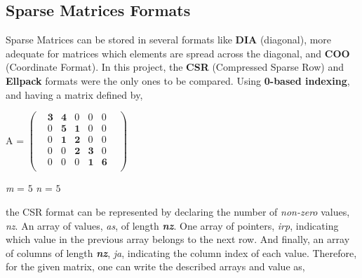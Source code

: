 \documentclass[12pt]{article}
\begin{document}
\subsection*{Sparse Matrices Formats}

\par Sparse Matrices can be stored in several formats like \textbf{DIA} (diagonal), more adequate for matrices which elements are spread across the diagonal,  and \textbf{COO} (Coordinate Format).\cite{sparse-gpu} In this project, the \textbf{CSR} (Compressed Sparse Row) and \textbf{Ellpack} formats were the only ones to be compared. Using \textbf{0-based indexing}, and having a matrix defined by,

\begin{center}
\centering
\begin{minipage}{.4\textwidth}
  \flushright
  A  =   
	$
	\begin{pmatrix}
    & \textbf{3} & \textbf{4} & 0 & 0 & 0 & \\
    & 0 & \textbf{5} & \textbf{1} & 0 & 0 & \\
    & 0 & \textbf{1} & \textbf{2} & 0 & 0 & \\
    & 0 & 0 & \textbf{2} & \textbf{3} & 0 & \\
    & 0 & 0 & 0 & \textbf{1} & \textbf{6} & \\
	\end{pmatrix}
	$
\end{minipage}%
\begin{minipage}{.4\textwidth}
 \center
  \textit{m} = $5$
  \linebreak
  \textit{n} = $5$
\end{minipage}
\linebreak
\end{center}

\par the CSR format can be represented by declaring the number of \textit{non-zero} values, \textit{nz}. An array of values, \textit{as}, of length \textbf{\textit{nz}}. One array of pointers, \textit{irp}, indicating which value in the previous array belongs to the next row. And finally, an array of columns of length \textbf{\textit{nz}}, \textit{ja}, indicating the column index of each value. Therefore, for the given matrix, one can write the described arrays and value as,
\end{document}

